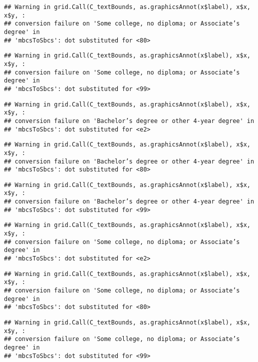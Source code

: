 \documentclass[
]{article}
\begin{document}
\begin{verbatim}
## Warning in grid.Call(C_textBounds, as.graphicsAnnot(x$label), x$x, x$y, :
## conversion failure on 'Some college, no diploma; or Associate’s degree' in
## 'mbcsToSbcs': dot substituted for <80>
\end{verbatim}

\begin{verbatim}
## Warning in grid.Call(C_textBounds, as.graphicsAnnot(x$label), x$x, x$y, :
## conversion failure on 'Some college, no diploma; or Associate’s degree' in
## 'mbcsToSbcs': dot substituted for <99>
\end{verbatim}

\begin{verbatim}
## Warning in grid.Call(C_textBounds, as.graphicsAnnot(x$label), x$x, x$y, :
## conversion failure on 'Bachelor’s degree or other 4-year degree' in
## 'mbcsToSbcs': dot substituted for <e2>
\end{verbatim}

\begin{verbatim}
## Warning in grid.Call(C_textBounds, as.graphicsAnnot(x$label), x$x, x$y, :
## conversion failure on 'Bachelor’s degree or other 4-year degree' in
## 'mbcsToSbcs': dot substituted for <80>
\end{verbatim}

\begin{verbatim}
## Warning in grid.Call(C_textBounds, as.graphicsAnnot(x$label), x$x, x$y, :
## conversion failure on 'Bachelor’s degree or other 4-year degree' in
## 'mbcsToSbcs': dot substituted for <99>
\end{verbatim}

\begin{verbatim}
## Warning in grid.Call(C_textBounds, as.graphicsAnnot(x$label), x$x, x$y, :
## conversion failure on 'Some college, no diploma; or Associate’s degree' in
## 'mbcsToSbcs': dot substituted for <e2>
\end{verbatim}

\begin{verbatim}
## Warning in grid.Call(C_textBounds, as.graphicsAnnot(x$label), x$x, x$y, :
## conversion failure on 'Some college, no diploma; or Associate’s degree' in
## 'mbcsToSbcs': dot substituted for <80>
\end{verbatim}

\begin{verbatim}
## Warning in grid.Call(C_textBounds, as.graphicsAnnot(x$label), x$x, x$y, :
## conversion failure on 'Some college, no diploma; or Associate’s degree' in
## 'mbcsToSbcs': dot substituted for <99>
\end{verbatim}
\end{document}
